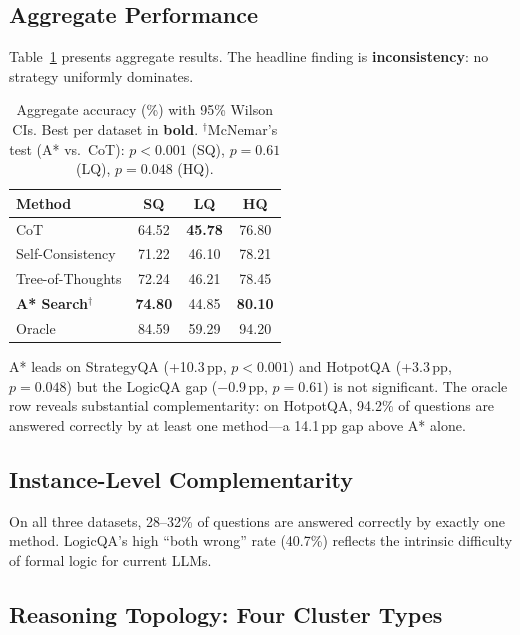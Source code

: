 \documentclass[11pt]{article}
\newcommand{\pp}{\,pp\xspace}
\begin{document}
\subsection{Aggregate Performance}
\label{sec:aggregate}

Table~\ref{tab:aggregate} presents aggregate results.  The headline finding is
\textbf{inconsistency}: no strategy uniformly dominates.

\begin{table}[t]
\centering
\caption{Aggregate accuracy (\%) with 95\% Wilson CIs.  Best per dataset in
\textbf{bold}.  $^\dagger$McNemar's test (A* vs.\ CoT):
$p < 0.001$ (SQ), $p = 0.61$ (LQ), $p = 0.048$ (HQ).}
\label{tab:aggregate}
\small
\begin{tabular}{@{}lccc@{}}
\toprule
\textbf{Method} & \textbf{SQ} & \textbf{LQ} & \textbf{HQ} \\
\midrule
CoT & 64.52 & \textbf{45.78} & 76.80 \\
Self-Consistency & 71.22 & 46.10 & 78.21 \\
Tree-of-Thoughts & 72.24 & 46.21 & 78.45 \\
\textbf{A* Search}$^\dagger$ & \textbf{74.80} & 44.85 & \textbf{80.10} \\
\midrule
Oracle & 84.59 & 59.29 & 94.20 \\
\bottomrule
\end{tabular}
\end{table}

A* leads on StrategyQA (+10.3\pp, $p < 0.001$) and HotpotQA (+3.3\pp,
$p = 0.048$) but the LogicQA gap ($-$0.9\pp, $p = 0.61$) is not significant.
The oracle row reveals substantial complementarity: on HotpotQA, 94.2\%
of questions are answered correctly by at least one method---a 14.1\pp gap
above A* alone.

\subsection{Instance-Level Complementarity}
\label{sec:complementarity}

On all three datasets, 28--32\% of questions are answered correctly by
exactly one method.  LogicQA's high ``both wrong'' rate (40.7\%) reflects
the intrinsic difficulty of formal logic for current LLMs.

\subsection{Reasoning Topology: Four Cluster Types}
\label{sec:topology}
\end{document}
